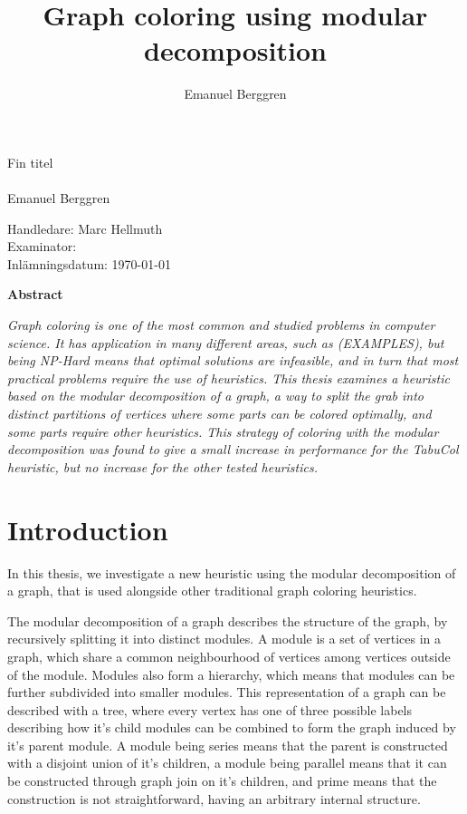 \documentclass[a4paper]{article}
\author{Emanuel Berggren}
\title{Graph coloring using modular decomposition}
\newcommand{\Framsida}{\AddToShipoutPicture*{\put(0,0){\texttt{[image: kandidatfram.pdf]}}}}
\begin{document}
\Framsida 
\vspace*{4cm}
\Huge{Fin titel}\\\\ %
\Large{Emanuel Berggren} %

\vspace*{12cm}
\Large{Handledare: Marc Hellmuth} \\ 
\Large{Examinator: } \\ 
\Large{Inlämningsdatum: \today}\\

\begin{center}
	\textbf{Abstract}
\end{center}
\textit{
Graph coloring is one of the most common and studied problems in computer
science. It has application in many different areas, such as (EXAMPLES), but
being NP-Hard means that optimal solutions are infeasible, and in turn that most
practical problems require the use of heuristics. This thesis examines a
heuristic based on the modular decomposition of a graph, a way to split the grab
into distinct partitions of vertices where some parts can be colored optimally,
and some parts require other heuristics. This strategy of coloring with the
modular decomposition was found to give a small increase in performance for the
TabuCol heuristic, but no increase for the other tested heuristics.
}




\section{Introduction}

In this thesis, we investigate a new heuristic using the modular decomposition of
a graph, that is used alongside other traditional graph coloring heuristics.

The modular decomposition of a graph describes the structure of the graph, by
recursively splitting it into distinct modules. A module is a set of vertices in
a graph, which share a common neighbourhood of vertices among vertices outside
of the module. Modules also form a hierarchy, which means that modules can be
further subdivided into smaller modules. This representation of a graph can be
described with a tree, where every vertex has one of three possible labels
describing how it's child modules can be combined to form the graph induced by
it's parent module. A module being series means that the parent is constructed
with a disjoint union of it's children, a module being parallel means that it
can be constructed through graph join on it's children, and prime means that the
construction is not straightforward, having an arbitrary internal structure.
\end{document}
